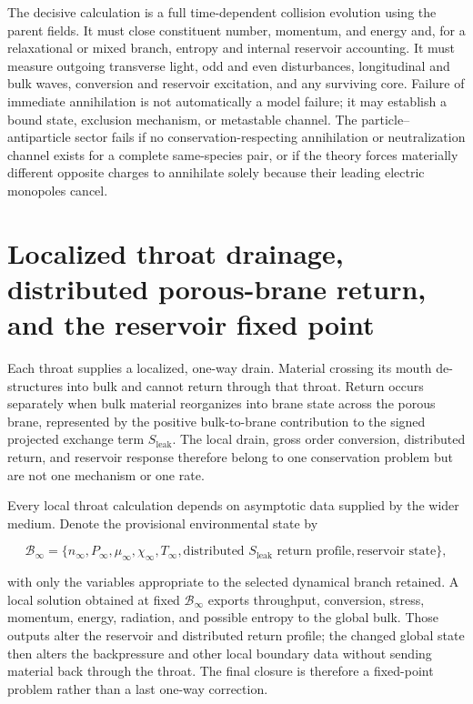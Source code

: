 The decisive calculation is a full time-dependent collision evolution using the
parent fields. It must close constituent number, momentum, and energy and, for a
relaxational or mixed branch, entropy and internal reservoir accounting. It must
measure outgoing transverse light, odd and even disturbances, longitudinal and
bulk waves, conversion and reservoir excitation, and any surviving core. Failure
of immediate annihilation is not automatically a model failure; it may establish
a bound state, exclusion mechanism, or metastable channel. The particle--
antiparticle sector fails if no conservation-respecting annihilation or
neutralization channel exists for a complete same-species pair, or if the theory
forces materially different opposite charges to annihilate solely because their
leading electric monopoles cancel.

\section{Localized throat drainage, distributed porous-brane return, and the
reservoir fixed point}

Each throat supplies a localized, one-way drain. Material crossing its mouth
de-structures into bulk and cannot return through that throat. Return occurs
separately when bulk material reorganizes into brane state across the porous
brane, represented by the positive bulk-to-brane contribution to the signed
projected exchange term \(S_{\mathrm{leak}}\). The local drain, gross order
conversion, distributed return, and reservoir response therefore belong to one
conservation problem but are not one mechanism or one rate.

Every local throat calculation depends on asymptotic data supplied by the wider
medium. Denote the provisional environmental state by

\[
\mathcal B_\infty
=
\{n_\infty,P_\infty,\mu_\infty,\chi_\infty,T_\infty,
\text{distributed }S_{\mathrm{leak}}\text{ return profile},
\text{reservoir state}\},
\]

with only the variables appropriate to the selected dynamical branch retained.
A local solution obtained at fixed \(\mathcal B_\infty\) exports throughput,
conversion, stress, momentum, energy, radiation, and possible entropy to the
global bulk. Those outputs alter the reservoir and distributed return profile;
the changed global state then alters the backpressure and other local boundary
data without sending material back through the throat. The final closure is
therefore a fixed-point problem rather than a last one-way correction.

